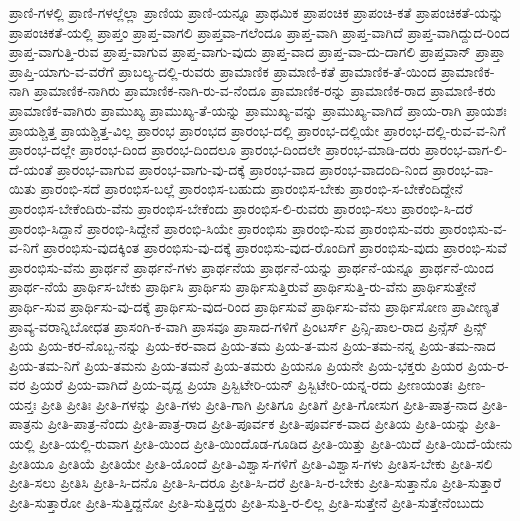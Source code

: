 {ಪ್ರಾಣಿ-ಗಳಲ್ಲಿ
ಪ್ರಾಣಿ-ಗಳಲ್ಲೆಲ್ಲಾ
ಪ್ರಾಣಿಯ
ಪ್ರಾಣಿ-ಯನ್ನೂ
ಪ್ರಾಥಮಿಕ
ಪ್ರಾಪಂಚಿಕ
ಪ್ರಾಪಂಚಿ-ಕತೆ
ಪ್ರಾಪಂಚಿಕತೆ-ಯನ್ನು
ಪ್ರಾಪಂಚಿಕತೆ-ಯಲ್ಲಿ
ಪ್ರಾಪ್ತಂ
ಪ್ರಾಪ್ತ-ವಾಗಲಿ
ಪ್ರಾಪ್ತವಾ-ಗಲೆಂದೂ
ಪ್ರಾಪ್ತ-ವಾಗಿ
ಪ್ರಾಪ್ತ-ವಾಗಿದೆ
ಪ್ರಾಪ್ತ-ವಾಗಿದ್ದುದ-ರಿಂದ
ಪ್ರಾಪ್ತ-ವಾಗುತ್ತಿ-ರುವ
ಪ್ರಾಪ್ತ-ವಾಗುವ
ಪ್ರಾಪ್ತ-ವಾಗು-ವುದು
ಪ್ರಾಪ್ತ-ವಾದ
ಪ್ರಾಪ್ತ-ವಾ-ದು-ದಾಗಲಿ
ಪ್ರಾಪ್ತವಾನ್
ಪ್ರಾಪ್ತಾ
ಪ್ರಾಪ್ತಿ-ಯಾಗು-ವ-ವರೆಗೆ
ಪ್ರಾಬಲ್ಯ-ದಲ್ಲಿ-ರುವರು
ಪ್ರಾಮಾಣಿಕ
ಪ್ರಾಮಾಣಿ-ಕತೆ
ಪ್ರಾಮಾಣಿಕ-ತೆ-ಯಿಂದ
ಪ್ರಾಮಾಣಿಕ-ನಾಗಿ
ಪ್ರಾಮಾಣಿಕ-ನಾಗಿರು
ಪ್ರಾಮಾಣಿಕ-ನಾಗಿ-ರು-ವ-ನೆಂದೂ
ಪ್ರಾಮಾಣಿಕ-ರನ್ನು
ಪ್ರಾಮಾಣಿಕ-ರಾದ
ಪ್ರಾಮಾಣಿ-ಕರು
ಪ್ರಾಮಾಣಿಕ-ವಾಗಿರು
ಪ್ರಾಮುಖ್ಯ
ಪ್ರಾಮುಖ್ಯ-ತೆ-ಯನ್ನು
ಪ್ರಾಮುಖ್ಯ-ವನ್ನು
ಪ್ರಾಮುಖ್ಯ-ವಾಗಿದೆ
ಪ್ರಾಯ-ರಾಗಿ
ಪ್ರಾಯಶಃ
ಪ್ರಾಯಶ್ಚಿತ್ತ
ಪ್ರಾಯಶ್ಚಿತ್ತ-ವಿಲ್ಲ
ಪ್ರಾರಂಭ
ಪ್ರಾರಂಭದ
ಪ್ರಾರಂಭ-ದಲ್ಲಿ
ಪ್ರಾರಂಭ-ದಲ್ಲಿಯೇ
ಪ್ರಾರಂಭ-ದಲ್ಲಿ-ರುವ-ವ-ನಿಗೆ
ಪ್ರಾರಂಭ-ದಲ್ಲೇ
ಪ್ರಾರಂಭ-ದಿಂದ
ಪ್ರಾರಂಭ-ದಿಂದಲೂ
ಪ್ರಾರಂಭ-ದಿಂದಲೇ
ಪ್ರಾರಂಭ-ಮಾಡಿ-ದರು
ಪ್ರಾರಂಭ-ವಾಗ-ಲಿ-ದೆ-ಯಂತೆ
ಪ್ರಾರಂಭ-ವಾಗುವ
ಪ್ರಾರಂಭ-ವಾಗು-ವು-ದಕ್ಕೆ
ಪ್ರಾರಂಭ-ವಾದ
ಪ್ರಾರಂಭ-ವಾದಂದಿ-ನಿಂದ
ಪ್ರಾರಂಭ-ವಾ-ಯಿತು
ಪ್ರಾರಂಭಿ-ಸದೆ
ಪ್ರಾರಂಭಿಸ-ಬಲ್ಲೆ
ಪ್ರಾರಂಭಿಸ-ಬಹುದು
ಪ್ರಾರಂಭಿಸ-ಬೇಕು
ಪ್ರಾರಂಭಿ-ಸ-ಬೇಕೆಂದಿದ್ದೇನೆ
ಪ್ರಾರಂಭಿಸ-ಬೇಕೆಂದಿರು-ವೆನು
ಪ್ರಾರಂಭಿಸ-ಬೇಕೆಂದು
ಪ್ರಾರಂಭಿಸ-ಲಿ-ರುವರು
ಪ್ರಾರಂಭಿ-ಸಲು
ಪ್ರಾರಂಭಿ-ಸಿ-ದರೆ
ಪ್ರಾರಂಭಿ-ಸಿದ್ದಾನೆ
ಪ್ರಾರಂಭಿ-ಸಿದ್ದೇನೆ
ಪ್ರಾರಂಭಿ-ಸಿಯೇ
ಪ್ರಾರಂಭಿಸು
ಪ್ರಾರಂಭಿ-ಸುವ
ಪ್ರಾರಂಭಿಸು-ವರು
ಪ್ರಾರಂಭಿಸು-ವ-ವ-ನಿಗೆ
ಪ್ರಾರಂಭಿಸು-ವುದಕ್ಕಿಂತ
ಪ್ರಾರಂಭಿಸು-ವು-ದಕ್ಕೆ
ಪ್ರಾರಂಭಿಸು-ವುದ-ರೊಂದಿಗೆ
ಪ್ರಾರಂಭಿಸು-ವುದು
ಪ್ರಾರಂಭಿ-ಸುವೆ
ಪ್ರಾರಂಭಿಸು-ವೆನು
ಪ್ರಾರ್ಥನೆ
ಪ್ರಾರ್ಥನೆ-ಗಳು
ಪ್ರಾರ್ಥನೆಯ
ಪ್ರಾರ್ಥನೆ-ಯನ್ನು
ಪ್ರಾರ್ಥನೆ-ಯನ್ನೂ
ಪ್ರಾರ್ಥನೆ-ಯಿಂದ
ಪ್ರಾರ್ಥ-ನೆಯೆ
ಪ್ರಾರ್ಥಿಸ-ಬೇಕು
ಪ್ರಾರ್ಥಿಸಿ
ಪ್ರಾರ್ಥಿಸು
ಪ್ರಾರ್ಥಿಸುತ್ತಿರುವೆ
ಪ್ರಾರ್ಥಿಸುತ್ತಿ-ರು-ವೆನು
ಪ್ರಾರ್ಥಿಸುತ್ತೇನೆ
ಪ್ರಾರ್ಥಿ-ಸುವ
ಪ್ರಾರ್ಥಿಸು-ವು-ದಕ್ಕೆ
ಪ್ರಾರ್ಥಿಸು-ವುದ-ರಿಂದ
ಪ್ರಾರ್ಥಿಸುವೆ
ಪ್ರಾರ್ಥಿಸು-ವೆನು
ಪ್ರಾರ್ಥಿಸೋಣ
ಪ್ರಾವೀಣ್ಯತೆ
ಪ್ರಾವ್ಯ-ವರಾನ್ನಿಬೋಧತ
ಪ್ರಾಸಂಗಿ-ಕ-ವಾಗಿ
ಪ್ರಾಸವೂ
ಪ್ರಾಸಾದ-ಗಳಿಗೆ
ಪ್ರಿಂಟರ್ಸ್
ಪ್ರಿನ್ಸಿ-ಪಾಲ-ರಾದ
ಪ್ರಿನ್ಸೆಸ್
ಪ್ರಿನ್ಸ್
ಪ್ರಿಯ
ಪ್ರಿಯ-ಕರ-ನೊಬ್ಬ-ನನ್ನು
ಪ್ರಿಯ-ಕರ-ವಾದ
ಪ್ರಿಯ-ತಮ
ಪ್ರಿಯ-ತ-ಮನ
ಪ್ರಿಯ-ತಮ-ನನ್ನ
ಪ್ರಿಯ-ತಮ-ನಾದ
ಪ್ರಿಯ-ತಮ-ನಿಗೆ
ಪ್ರಿಯ-ತಮನು
ಪ್ರಿಯ-ತಮನೆ
ಪ್ರಿಯ-ತಮರು
ಪ್ರಿಯನೂ
ಪ್ರಿಯನೇ
ಪ್ರಿಯ-ಭಕ್ತರು
ಪ್ರಿಯರ
ಪ್ರಿಯ-ರ-ವರ
ಪ್ರಿಯರೆ
ಪ್ರಿಯ-ವಾಗಿದೆ
ಪ್ರಿಯ-ವೃದ್ದ
ಪ್ರಿಯಾ
ಪ್ರಿಸ್ಬಿಟೇರಿ-ಯನ್
ಪ್ರಿಸ್ಬಿಟೇರಿ-ಯನ್ನ-ರದು
ಪ್ರೀಣಯಂತಃ
ಪ್ರೀಣ-ಯನ್ತಃ
ಪ್ರೀತಿ
ಪ್ರೀತಿಃ
ಪ್ರೀತಿ-ಗಳನ್ನು
ಪ್ರೀತಿ-ಗಳು
ಪ್ರೀತಿ-ಗಾಗಿ
ಪ್ರೀತಿಗೂ
ಪ್ರೀತಿಗೆ
ಪ್ರೀತಿ-ಗೋಸುಗ
ಪ್ರೀತಿ-ಪಾತ್ರ-ನಾದ
ಪ್ರೀತಿ-ಪಾತ್ರನು
ಪ್ರೀತಿ-ಪಾತ್ರ-ನೆಂದು
ಪ್ರೀತಿ-ಪಾತ್ರ-ರಾದ
ಪ್ರೀತಿ-ಪೂರ್ವಕ
ಪ್ರೀತಿ-ಪೂರ್ವಕ-ವಾದ
ಪ್ರೀತಿಯ
ಪ್ರೀತಿ-ಯನ್ನು
ಪ್ರೀತಿ-ಯಲ್ಲಿ
ಪ್ರೀತಿ-ಯಲ್ಲಿ-ರುವಾಗ
ಪ್ರೀತಿ-ಯಿಂದ
ಪ್ರೀತಿ-ಯಿಂದೊಡ-ಗೂಡಿದ
ಪ್ರೀತಿ-ಯಿತ್ತು
ಪ್ರೀತಿ-ಯಿದೆ
ಪ್ರೀತಿ-ಯಿದೆ-ಯೇನು
ಪ್ರೀತಿಯೂ
ಪ್ರೀತಿಯೆ
ಪ್ರೀತಿಯೇ
ಪ್ರೀತಿ-ಯೊಂದೆ
ಪ್ರೀತಿ-ವಿಶ್ವಾಸ-ಗಳಿಗೆ
ಪ್ರೀತಿ-ವಿಶ್ವಾಸ-ಗಳು
ಪ್ರೀತಿಸ-ಬೇಕು
ಪ್ರೀತಿ-ಸಲಿ
ಪ್ರೀತಿ-ಸಲು
ಪ್ರೀತಿಸಿ
ಪ್ರೀತಿ-ಸಿ-ದನೊ
ಪ್ರೀತಿ-ಸಿ-ದರೂ
ಪ್ರೀತಿ-ಸಿ-ದರೆ
ಪ್ರೀತಿ-ಸಿ-ರ-ಬೇಕು
ಪ್ರೀತಿ-ಸುತ್ತಾನೊ
ಪ್ರೀತಿ-ಸುತ್ತಾರೆ
ಪ್ರೀತಿ-ಸುತ್ತಾರೋ
ಪ್ರೀತಿ-ಸುತ್ತಿದ್ದನೋ
ಪ್ರೀತಿ-ಸುತ್ತಿದ್ದರು
ಪ್ರೀತಿ-ಸುತ್ತಿ-ರ-ಲಿಲ್ಲ
ಪ್ರೀತಿ-ಸುತ್ತೇನೆ
ಪ್ರೀತಿ-ಸುತ್ತೇನೆಂಬುದು
}

